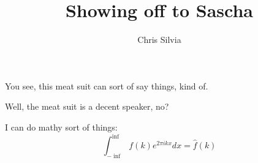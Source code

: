 \documentclass[12pt]{article}
\author{Chris Silvia}
\title{Showing off to Sascha}
\begin{document}
\maketitle

You see, this meat suit can sort of say things, kind of.

Well, the meat suit is a decent speaker, no?

I can do mathy sort of things:
$$\int_{-\inf}^{\inf} f(k) e^{2 \pi i k x} dx = \hat{f}(k)$$
\end{document}
